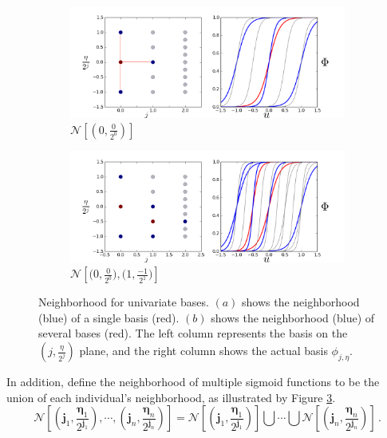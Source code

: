 \begin{figure}[Htbp]\begin{center}
    \begin{subfigure}[p]{1.\textwidth}
        \centering
        \includegraphics[width=10cm]{../basis_neighbor.png}
        \caption{$\mathcal{N}\left[\left(0,\frac{0}{2^0}\right)\right]$}
        \label{fig: basis neighbor}
    \end{subfigure}
    \begin{subfigure}[p]{1.\textwidth}
        \centering
        \includegraphics[width=10cm]{../basis_neighbor_2.png}
        \caption{$\mathcal{N}\left[ \big(0, \frac{0}{2^0}\big), \big(1, \frac{-1}{2^1}\big)
                 \right]$}
        \label{fig: union neighbor}
    \end{subfigure}
    \caption{Neighborhood for univariate bases. 
             $(a)$ shows the neighborhood (blue)
             of a single basis (red).  $(b)$ shows the neighborhood (blue) 
             of several bases (red). 
             The left column represents the basis on the $\left(j, \frac{\eta}{2^j}\right)$ plane,
             and the right column shows the actual basis $\phi_{j,\eta}$.}
\end{center}\end{figure}
In addition, define the neighborhood of multiple sigmoid functions to be the union
of each individual's neighborhood, as illustrated by Figure \ref{fig: union neighbor}.
\begin{equation}
    \mathcal{N}\left[(\boldsymbol{j}_1, \frac{\boldsymbol{\eta}_1}{2^{\boldsymbol{j}_1}} ), \cdots, 
    ( \boldsymbol{j}_n, \frac{\boldsymbol{\eta}_n}{2^{\boldsymbol{j}_n}}) \right]
    = \mathcal{N}\left[(\boldsymbol{j}_1, \frac{\boldsymbol{\eta}_1}{2^{\boldsymbol{j}_1}})\right]\bigcup \cdots 
      \bigcup \mathcal{N}\left[(\boldsymbol{j}_n, \frac{\boldsymbol{\eta}_n}{2^{\boldsymbol{j}_n}})\right]\,.
\end{equation}\\

